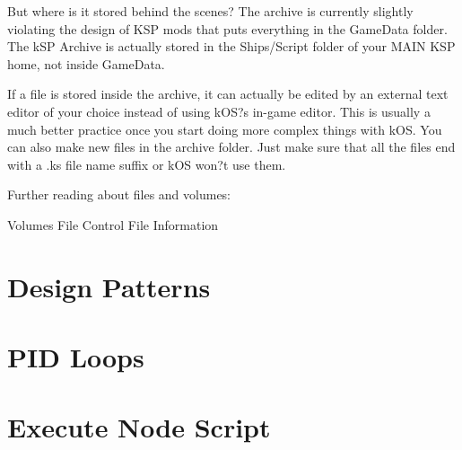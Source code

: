 But where is it stored behind the scenes? The archive is currently slightly violating the design of KSP mods that puts everything in the GameData folder. The kSP Archive is actually stored in the Ships/Script folder of your MAIN KSP home, not inside GameData.

If a file is stored inside the archive, it can actually be edited by an external text editor of your choice instead of using kOS?s in-game editor. This is usually a much better practice once you start doing more complex things with kOS. You can also make new files in the archive folder. Just make sure that all the files end with a .ks file name suffix or kOS won?t use them.	

Further reading about files and volumes:

Volumes
File Control
File Information		
	\section{Design Patterns}
	\section{PID Loops}
	\section{Execute Node Script}